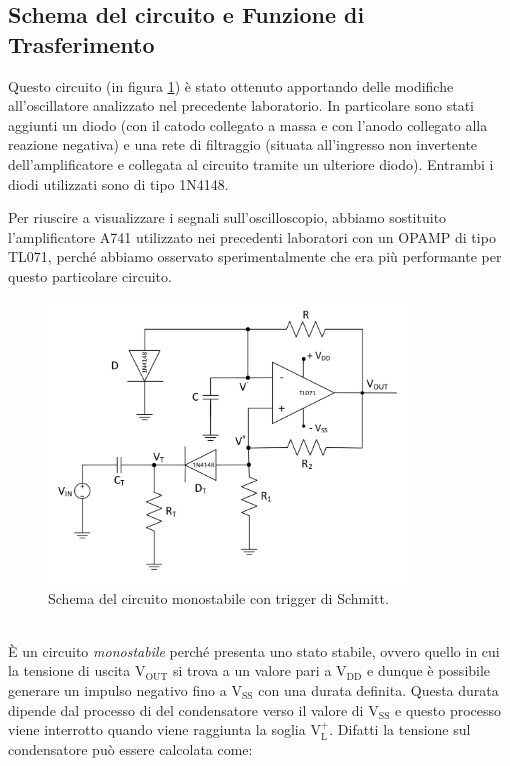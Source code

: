\documentclass{report}
\begin{document}
\subsection{Schema del circuito e Funzione di Trasferimento}
Questo circuito (in figura \ref{figura:schema1}) è stato ottenuto apportando delle modifiche all'oscillatore analizzato nel precedente laboratorio. In particolare sono stati aggiunti un diodo (con il catodo collegato a massa e con l'anodo collegato alla reazione negativa) e una rete di filtraggio (situata all'ingresso non invertente dell'amplificatore e collegata al circuito tramite un ulteriore diodo). Entrambi i diodi utilizzati sono di tipo 1N4148.\par
Per riuscire a visualizzare i segnali sull'oscilloscopio, abbiamo sostituito l'amplificatore \textmu A741 utilizzato nei precedenti laboratori con un OPAMP di tipo TL071, perché abbiamo osservato sperimentalmente che era più performante per questo particolare circuito.
\begin{figure}[h]
	\centering
	\includegraphics[height=7.5cm]{immagini/schema1}
	\caption{Schema del circuito monostabile con trigger di Schmitt.}
	\label{figura:schema1}
\end{figure}
\\\` E un circuito \textit{monostabile} perché presenta uno stato stabile, ovvero quello in cui la tensione di uscita $\displaystyle\mathrm{V_{OUT}}$ si trova a un valore pari a $\displaystyle\mathrm{V_{DD}}$ e dunque è possibile generare un impulso negativo fino a $\displaystyle\mathrm{V_{SS}}$ con una durata definita. Questa durata dipende dal processo di  del condensatore verso il valore di $\displaystyle\mathrm{V_{SS}}$ e questo processo viene interrotto quando viene raggiunta la soglia $\displaystyle\mathrm{V_L^+}$. Difatti la tensione sul condensatore può essere calcolata come:
\end{document}
